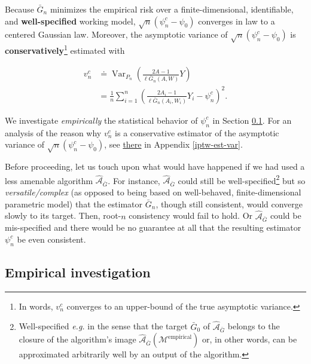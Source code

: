 \documentclass[
  11pt,
  openright,twoside]{book}
\DeclareMathOperator{\Var}{Var}
\newcommand{\Algo}{\widehat{\mathcal{A}}}
\newcommand{\defq}{\doteq}
\newcommand{\calM}{\mathcal{M}}
\newcommand{\Gbar}{\bar{G}}
\theoremstyle{definition}
\theoremstyle{definition}
\theoremstyle{definition}
\theoremstyle{definition}
\theoremstyle{remark}
\begin{document}
Because \(\Gbar_{n}\) minimizes the empirical risk over a finite-dimensional,
identifiable, and \textbf{well-specified} working model, \(\sqrt{n} (\psi_{n}^{c} - \psi_{0})\) converges in law to a centered Gaussian law.
Moreover, the asymptotic variance of \(\sqrt{n} (\psi_{n}^{c} - \psi_{0})\) is
\textbf{conservatively}\footnote{In words, \(v_{n}^{c}\) converges to an upper-bound of the
  true asymptotic variance.} estimated
with

\begin{align*}            v_{n}^{c}            &\defq            \Var_{P_{n}}
\left(\frac{2A-1}{\ell\Gbar_{n}(A,W)}Y\right)      \\      &=      \frac{1}{n}
\sum_{i=1}^{n}\left(\frac{2A_{i}-1}{\ell\Gbar_{n}   (A_{i},W_{i})}   Y_{i}   -
\psi_{n}^{c}\right)^{2}.  \end{align*}

We investigate \emph{empirically} the statistical behavior of \(\psi_{n}^{c}\) in
Section \ref{empirical-inves-IPTW-bis}. For an analysis of the reason why
\(v_{n}^{c}\) is a conservative estimator of the asymptotic variance of
\(\sqrt{n} (\psi_{n}^{c} - \psi_{0})\), see \protect\hyperlink{iptw-est-var}{there} in Appendix
\ref{iptw-est-var}.

Before proceeding, let us touch upon what would have happened if we had used a
less amenable algorithm \(\Algo_{\Gbar}\). For instance, \(\Algo_{\Gbar}\) could
still be well-specified\footnote{Well-specified \emph{e.g.} in the sense that the target
  \(\Gbar_{0}\) of \(\Algo_{\Gbar}\) belongs to the closure of the algorithm's image
  \(\Algo_{\Gbar}(\calM^{\text{empirical}})\) or, in other words, can be
  approximated arbitrarily well by an output of the algorithm.} but so
\emph{versatile/complex} (as opposed to being based on well-behaved,
finite-dimensional parametric model) that the estimator \(\Gbar_{n}\), though
still consistent, would converge slowly to its target. Then, root-\(n\)
consistency would fail to hold. Or \(\Algo_{\Gbar}\) could be
mis-specified and there would be no guarantee at all
that the resulting estimator \(\psi_{n}^{c}\) be even consistent.

\hypertarget{empirical-inves-IPTW-bis}{%
\subsection{Empirical investigation}\label{empirical-inves-IPTW-bis}}
\end{document}
